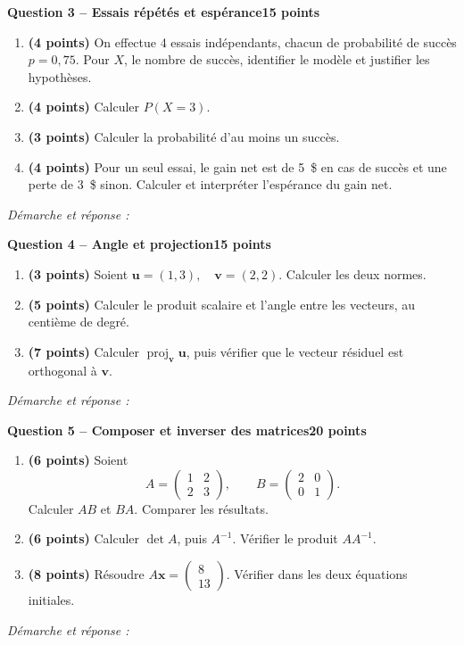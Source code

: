 \documentclass[11pt,a4paper]{article}
\begin{document}
\newpage
{\large\bfseries Question 3 -- Essais répétés et espérance}\hfill\textbf{15 points}\par
\begin{enumerate}
\item \textbf{(4 points)} On effectue 4 essais indépendants, chacun de probabilité de succès \(p=0{,}75\). Pour \(X\), le nombre de succès, identifier le modèle et justifier les hypothèses.
\item \textbf{(4 points)} Calculer \(P(X=3)\).
\item \textbf{(3 points)} Calculer la probabilité d’au moins un succès.
\item \textbf{(4 points)} Pour un seul essai, le gain net est de 5~\$ en cas de succès et une perte de 3~\$ sinon. Calculer et interpréter l’espérance du gain net.
\end{enumerate}
\vspace{3mm}\textit{Démarche et réponse :}\par\vfill

\newpage
{\large\bfseries Question 4 -- Angle et projection}\hfill\textbf{15 points}\par
\begin{enumerate}
\item \textbf{(3 points)} Soient \(\mathbf u=(1,3),\quad\mathbf v=(2,2)\). Calculer les deux normes.
\item \textbf{(5 points)} Calculer le produit scalaire et l’angle entre les vecteurs, au centième de degré.
\item \textbf{(7 points)} Calculer \(\operatorname{proj}_{\mathbf v}\mathbf u\), puis vérifier que le vecteur résiduel est orthogonal à \(\mathbf v\).
\end{enumerate}
\vspace{3mm}\textit{Démarche et réponse :}\par\vfill

\newpage
{\large\bfseries Question 5 -- Composer et inverser des matrices}\hfill\textbf{20 points}\par
\begin{enumerate}
\item \textbf{(6 points)} Soient \[A=\begin{pmatrix}1 & 2\\2 & 3\end{pmatrix},\qquad B=\begin{pmatrix}2 & 0\\0 & 1\end{pmatrix}.\] Calculer \(AB\) et \(BA\). Comparer les résultats.
\item \textbf{(6 points)} Calculer \(\det A\), puis \(A^{-1}\). Vérifier le produit \(AA^{-1}\).
\item \textbf{(8 points)} Résoudre \(A\mathbf x=\begin{pmatrix}8\\13\end{pmatrix}\). Vérifier dans les deux équations initiales.
\end{enumerate}
\vspace{3mm}\textit{Démarche et réponse :}\par\vfill
\end{document}
